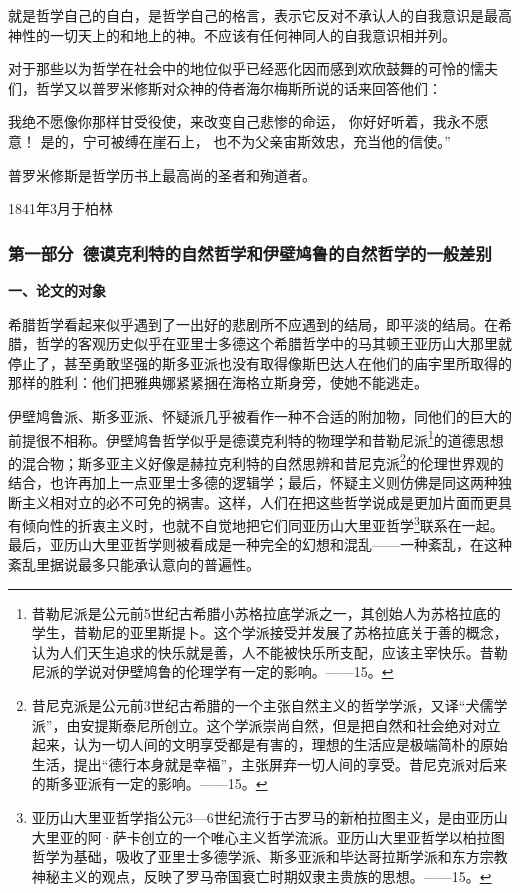 \documentclass[a4paper,twoside,12pt,AutoFakeBold]{ctexart}
\begin{document}
 就是哲学自己的自白，是哲学自己的格言，表示它反对不承认人的自我意识是最高神性的一切天上的和地上的神。不应该有任何神同人的自我意识相并列。

对于那些以为哲学在社会中的地位似乎已经恶化因而感到欢欣鼓舞的可怜的懦夫们，哲学又以普罗米修斯对众神的侍者海尔梅斯所说的话来回答他们：

    \begin{fangsong}
 我绝不愿像你那样甘受役使，来改变自己悲惨的命运，
    你好好听着，我永不愿意！
    是的，宁可被缚在崖石上，
    也不为父亲宙斯效忠，充当他的信使。”       
    \end{fangsong}

普罗米修斯是哲学历书上最高尚的圣者和殉道者。

1841年3月于柏林

\subsubsection{第一部分~德谟克利特的自然哲学和伊壁鸠鲁的自然哲学的一般差别}
\textbf{一、论文的对象}

 希腊哲学看起来似乎遇到了一出好的悲剧所不应遇到的结局，即平淡的结局。在希腊，哲学的客观历史似乎在亚里士多德这个希腊哲学中的马其顿王亚历山大那里就停止了，甚至勇敢坚强的斯多亚派也没有取得像斯巴达人在他们的庙宇里所取得的那样的胜利：他们把雅典娜紧紧捆在海格立斯身旁，使她不能逃走。

伊壁鸠鲁派、斯多亚派、怀疑派几乎被看作一种不合适的附加物，同他们的巨大的前提很不相称。伊壁鸠鲁哲学似乎是德谟克利特的物理学和昔勒尼派\footnote{昔勒尼派是公元前5世纪古希腊小苏格拉底学派之一，其创始人为苏格拉底的学生，昔勒尼的亚里斯提卜。这个学派接受并发展了苏格拉底关于善的概念，认为人们天生追求的快乐就是善，人不能被快乐所支配，应该主宰快乐。昔勒尼派的学说对伊壁鸠鲁的伦理学有一定的影响。——15。}的道德思想的混合物；斯多亚主义好像是赫拉克利特的自然思辨和昔尼克派\footnote{昔尼克派是公元前3世纪古希腊的一个主张自然主义的哲学学派，又译“犬儒学派”，由安提斯泰尼所创立。这个学派崇尚自然，但是把自然和社会绝对对立起来，认为一切人间的文明享受都是有害的，理想的生活应是极端简朴的原始生活，提出“德行本身就是幸福”，主张屏弃一切人间的享受。昔尼克派对后来的斯多亚派有一定的影响。——15。}的伦理世界观的结合，也许再加上一点亚里士多德的逻辑学；最后，怀疑主义则仿佛是同这两种独断主义相对立的必不可免的祸害。这样，人们在把这些哲学说成是更加片面而更具有倾向性的折衷主义时，也就不自觉地把它们同亚历山大里亚哲学\footnote{亚历山大里亚哲学指公元3—6世纪流行于古罗马的新柏拉图主义，是由亚历山大里亚的阿·萨卡创立的一个唯心主义哲学流派。亚历山大里亚哲学以柏拉图哲学为基础，吸收了亚里士多德学派、斯多亚派和毕达哥拉斯学派和东方宗教神秘主义的观点，反映了罗马帝国衰亡时期奴隶主贵族的思想。——15。}联系在一起。最后，亚历山大里亚哲学则被看成是一种完全的幻想和混乱——一种紊乱，在这种紊乱里据说最多只能承认意向的普遍性。
\end{document}
